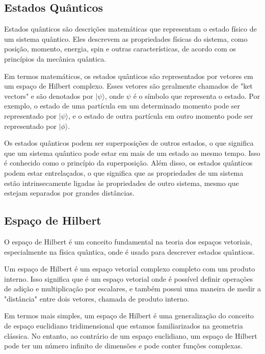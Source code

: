 \documentclass[12pt]{article}
\begin{document}
\subsection{Estados Quânticos}

Estados quânticos são descrições matemáticas que representam o estado físico de um sistema quântico. Eles descrevem as propriedades físicas do sistema, como posição, momento, energia, spin e outras características, de acordo com os princípios da mecânica quântica.

Em termos matemáticos, os estados quânticos são representados por vetores em um espaço de Hilbert complexo. Esses vetores são geralmente chamados de "ket vectors" e são denotados por $|\psi\rangle$, onde $\psi$ é o símbolo que representa o estado. Por exemplo, o estado de uma partícula em um determinado momento pode ser representado por $|\psi\rangle$, e o estado de outra partícula em outro momento pode ser representado por $|\phi\rangle$.

Os estados quânticos podem ser superposições de outros estados, o que significa que um sistema quântico pode estar em mais de um estado ao mesmo tempo. Isso é conhecido como o princípio da superposição. Além disso, os estados quânticos podem estar entrelaçados, o que significa que as propriedades de um sistema estão intrinsecamente ligadas às propriedades de outro sistema, mesmo que estejam separados por grandes distâncias.

\subsection{Espaço de Hilbert}


O espaço de Hilbert é um conceito fundamental na teoria dos espaços vetoriais, especialmente na física quântica, onde é usado para descrever estados quânticos.

Um espaço de Hilbert é um espaço vetorial complexo completo com um produto interno. Isso significa que é um espaço vetorial onde é possível definir operações de adição e multiplicação por escalares, e também possui uma maneira de medir a "distância" entre dois vetores, chamada de produto interno.

Em termos mais simples, um espaço de Hilbert é uma generalização do conceito de espaço euclidiano tridimensional que estamos familiarizados na geometria clássica. No entanto, ao contrário de um espaço euclidiano, um espaço de Hilbert pode ter um número infinito de dimensões e pode conter funções complexas.
\end{document}
